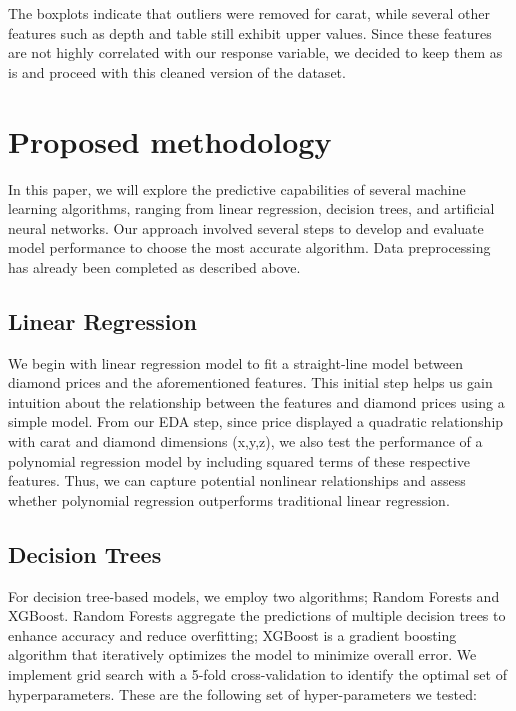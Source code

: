 \documentclass[conference]{IEEEtran}
\begin{document}
The boxplots indicate that outliers were removed for carat, while several other features such as depth and table still exhibit upper values. Since these features are not highly correlated with our response variable, we decided to keep them as is and proceed with this cleaned version of the dataset. 

\section{Proposed methodology}

In this paper, we will explore the predictive capabilities of several machine learning algorithms, ranging from linear regression, decision trees, and artificial neural networks. Our approach involved several steps to develop and evaluate model performance to choose the most accurate algorithm. Data preprocessing has already been completed as described above.

\subsection{Linear Regression}

We begin with linear regression model to fit a straight-line model between diamond prices and the aforementioned features. This initial step helps us gain intuition about the relationship between the features and diamond prices using a simple model. From our EDA step, since price displayed a quadratic relationship with carat and diamond dimensions (x,y,z), we also test the performance of a polynomial regression model by including squared terms of these respective features. Thus, we can capture potential nonlinear relationships and assess whether polynomial regression outperforms traditional linear regression.

\subsection{Decision Trees} 

For decision tree-based models, we employ two algorithms; Random Forests and XGBoost. Random Forests aggregate the predictions of multiple decision trees to enhance accuracy and reduce overfitting; XGBoost is a gradient boosting algorithm that iteratively optimizes the model to minimize overall error. We implement grid search with a 5-fold cross-validation to identify the optimal set of hyperparameters. These are the following set of hyper-parameters we tested: 
\end{document}
